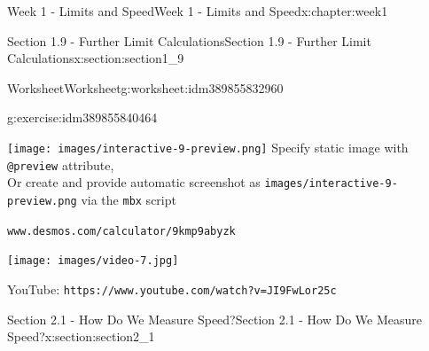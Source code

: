 \documentclass[oneside,10pt,]{book}
\newcommand{\mono}[1]{\texttt{#1}}
\numberwithin{equation}{section}
\newlength{\qrsize}
\newlength{\previewwidth}
\begin{document}
\begin{chapterptx}{Week 1 - Limits and Speed}{}{Week 1 - Limits and Speed}{}{}{x:chapter:week1}
\begin{sectionptx}{Section 1.9 - Further Limit Calculations}{}{Section 1.9 - Further Limit Calculations}{}{}{x:section:section1_9}
\begin{worksheet-subsection}{Worksheet}{}{Worksheet}{}{}{g:worksheet:idm389855832960}
\begin{divisionexercise}{2}{}{}{g:exercise:idm389855840464}
\par
\setlength{\qrsize}{9em}
\setlength{\previewwidth}{\linewidth}
\addtolength{\previewwidth}{-\qrsize}
\begin{tcbraster}[raster columns=2, raster column skip=1pt, raster halign=center, raster force size=false, raster left skip=0pt, raster right skip=0pt]%
\begin{tcolorbox}[previewstyle, width=\previewwidth]%
%
{\texttt{[image: images/interactive-9-preview.png]}}%
{\small{}Specify static image with \mono{@preview} attribute,\\Or create and provide automatic screenshot as \mono{images/interactive-9-preview.png} via the \mono{mbx} script}%
\end{tcolorbox}%
\begin{tcolorbox}[qrstyle]%
{\hypersetup{urlcolor=black}}%
\end{tcolorbox}%
\begin{tcolorbox}[captionstyle]%
\small \mono{www.desmos.com/calculator/9kmp9abyzk}\end{tcolorbox}%
\end{tcbraster}%
%
\end{divisionexercise}%
\end{worksheet-subsection}
\restoregeometry
\setlength{\qrsize}{9em}
\setlength{\previewwidth}{\linewidth}
\addtolength{\previewwidth}{-\qrsize}
\begin{tcbraster}[raster columns=2, raster column skip=1pt, raster halign=center, raster force size=false, raster left skip=0pt, raster right skip=0pt]%
\begin{tcolorbox}[previewstyle, width=\previewwidth]%
\texttt{[image: images/video-7.jpg]}%
\end{tcolorbox}%
\begin{tcolorbox}[qrstyle]%
{\hypersetup{urlcolor=black}}%
\end{tcolorbox}%
\begin{tcolorbox}[captionstyle]%
\small YouTube: \mono{https://www.youtube.com/watch?v=JI9FwLor25c}\end{tcolorbox}%
\end{tcbraster}%
\end{sectionptx}
%
%
\typeout{************************************************}
\typeout{************************************************}
%
\begin{sectionptx}{Section 2.1 - How Do We Measure Speed?}{}{Section 2.1 - How Do We Measure Speed?}{}{}{x:section:section2_1}

\end{sectionptx}
\end{chapterptx}
\end{document}
